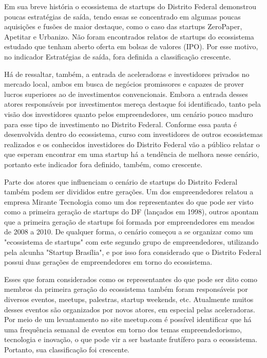 Em sua breve história o ecossistema de startups do Distrito Federal demonstrou poucas estratégias de saída, tendo essas se concentrado em algumas poucas aquisições e fusões de maior destaque, como o caso das startups ZeroPaper, Apetitar e Urbanizo. Não foram encontrados relatos de startups do ecossistema estudado que tenham aberto oferta em bolsas de valores (IPO). Por esse motivo, no indicador Estratégias de saída, fora definida a classificação crescente. 

Há de ressaltar, também, a entrada de aceleradoras e investidores privados no mercado local, ambos em busca de negócios promissores e capazes de prover lucros superiores ao de investimentos convencionais. Embora a entrada desses atores responsáveis por investimentos mereça destaque foi identificado, tanto pela visão dos investidores quanto pelos empreendedores, um cenário pouco maduro para esse tipo de investimento no Distrito Federal. Conforme essa pauta é desenvolvida dentro do ecossistema, curso com investidores de outros ecossistemas realizados e os conhecidos investidores do Distrito Federal vão a público relatar o que esperam encontrar em uma startup há a tendência de melhora nesse cenário, portanto este indicador fora definido, também, como crescente.

Parte dos atores que influenciam o cenário de startups do Distrito Federal também podem ser divididos entre gerações. Um dos empreendedores relatou a empresa Mirante Tecnologia como um dos representantes do que pode ser visto como a primeira geração de startups do DF (lançados em 1998), outros apontam que a primeira geração de startups foi formada por empreendedores em meados de 2008 a 2010. De qualquer forma, o cenário começou a se organizar como um "ecossistema de startups" com este segundo grupo de empreendedores, utilizando pela alcunha "Startup Brasília", e por isso fora considerado que o Distrito Federal possui duas gerações de empreendedores em torno do ecossistema.

Esses que foram considerados como os representantes do que pode ser dito como membros da primeira geração do ecossistema também foram responsáveis por diversos eventos, meetups, palestras, startup weekends, etc. Atualmente muitos desses eventos são organizados por novos atores, em especial pelas aceleradoras. Por meio de um levantamento no site meetup.com é possível identificar que há uma frequência semanal de eventos em torno dos temas empreendedorismo, tecnologia e inovação, o que pode vir a ser bastante frutífero para o ecossistema. Portanto, sua classificação foi crescente.

